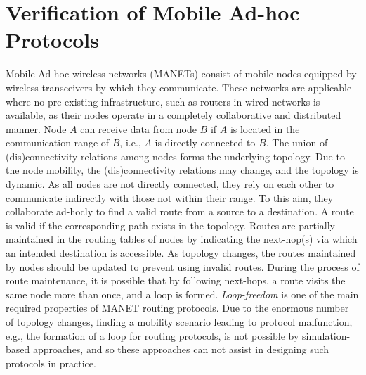 \section{Verification of Mobile Ad-hoc Protocols}\label{sec::wrebeca} 
Mobile Ad-hoc wireless networks (MANETs) consist of mobile nodes equipped by wireless transceivers by which they communicate. These networks are applicable where no pre-existing infrastructure, such as routers in wired networks %
is available, 
as their nodes operate in a completely collaborative and distributed manner.
Node $A$ can receive data from  node $B$ if $A$ is located in the communication range of $B$, i.e., $A$ is directly connected to $B$. The union of (dis)connectivity
relations among nodes forms the underlying topology.  Due to the node mobility, the (dis)connectivity relations may change, and the topology is dynamic. As all nodes are not directly connected, they rely on each other to communicate indirectly with those not within their range. To this aim, they collaborate ad-hocly to find a valid route from a source to a destination. A route is valid if the corresponding path exists in the topology. Routes are partially maintained in the routing tables of nodes by indicating the next-hop(s) via which an intended destination is accessible. As topology changes, the routes maintained by nodes should be updated to prevent using  invalid routes. %
During the process of route maintenance, it is possible that by following next-hops, a route visits the same node more than once, and a loop is formed. 
\emph{Loop-freedom} is one of the main required properties of MANET routing protocols. 
Due to the enormous number of topology changes, finding a mobility scenario leading to protocol malfunction, e.g., the formation of a loop for routing protocols, is not possible by simulation-based approaches, and so these approaches can not assist in designing such protocols in practice.   



